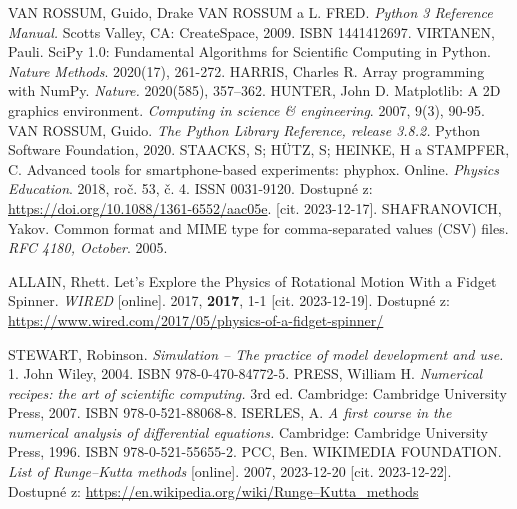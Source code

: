 \documentclass[12pt, a4paper,
 twoside,        %
 openright
]{report}
\begin{document}
\begin{thebibliography}{99}
     VAN ROSSUM, Guido, Drake VAN ROSSUM a L. FRED. \textit{Python 3 Reference Manual.} Scotts Valley, CA: CreateSpace, 2009. ISBN 1441412697.
     VIRTANEN, Pauli. SciPy 1.0: Fundamental Algorithms for Scientific Computing in Python. \textit{Nature Methods}. 2020(17), 261-272.
     HARRIS, Charles R. Array programming with NumPy. \textit{Nature.} 2020(585), 357–362.
     HUNTER, John D. Matplotlib: A 2D graphics environment. \textit{Computing in science \& engineering}. 2007, 9(3), 90-95.
     VAN ROSSUM, Guido. \textit{The Python Library Reference, release 3.8.2.} Python Software Foundation, 2020.
     STAACKS, S; HÜTZ, S; HEINKE, H a STAMPFER, C. Advanced tools for smartphone-based experiments: phyphox. Online. \textit{Physics Education}. 2018, roč. 53, č. 4. ISSN 0031-9120. Dostupné z: \url{https://doi.org/10.1088/1361-6552/aac05e}. [cit. 2023-12-17].
     SHAFRANOVICH, Yakov. Common format and MIME type for comma-separated values (CSV) files. \textit{RFC 4180, October}. 2005.

     ALLAIN, Rhett. Let’s Explore the Physics of Rotational Motion With a Fidget Spinner. \textit{WIRED} [online]. 2017, \textbf{2017}, 1-1 [cit. 2023-12-19]. Dostupné z: \url{https://www.wired.com/2017/05/physics-of-a-fidget-spinner/}

     STEWART, Robinson. \textit{Simulation – The practice of model development and use.} 1. John Wiley, 2004. ISBN 978-0-470-84772-5.
     PRESS, William H. \textit{Numerical recipes: the art of scientific computing.} 3rd ed. Cambridge: Cambridge University Press, 2007. ISBN 978-0-521-88068-8.
     ISERLES, A. \textit{A first course in the numerical analysis of differential equations.} Cambridge: Cambridge University Press, 1996. ISBN 978-0-521-55655-2.
     PCC, Ben. WIKIMEDIA FOUNDATION. \textit{List of Runge–Kutta methods} [online]. 2007, 2023-12-20 [cit. 2023-12-22]. Dostupné z: \url{https://en.wikipedia.org/wiki/Runge–Kutta_methods}


\end{thebibliography}
\end{document}
